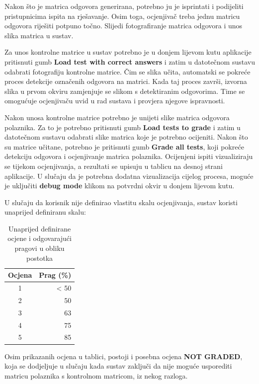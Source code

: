 \documentclass{foi}
\begin{document}
Nakon što je matrica odgovora generirana, potrebno ju je isprintati i podijeliti pristupnicima ispita na rješavanje. Osim toga, ocjenjivač treba jednu matricu odgovora riješiti potpuno točno. Slijedi fotografiranje matrica odgovora i unos slika matrica u sustav.

Za unos kontrolne matrice u sustav potrebno je u donjem lijevom kutu aplikacije pritisnuti gumb \textbf{Load test with correct answers} i zatim u datotečnom sustavu odabrati fotografiju kontrolne matrice. Čim se slika učita, automatski se pokreće proces detekcije označenih odgovora na matrici. Kada taj proces završi, izvorna slika u prvom okviru zamjenjuje se slikom s detektiranim odgovorima. Time se omogućuje ocjenjivaču uvid u rad sustava i provjera njegove ispravnosti.

Nakon unosa kontrolne matrice potrebno je unijeti slike matrica odgovora polaznika. Za to je potrebno pritisnuti gumb \textbf{Load tests to grade} i zatim u datotečnom sustavu odabrati slike matrica koje je potrebno ocijeniti. Nakon što su matrice učitane, potrebno je pritisnuti gumb \textbf{Grade all tests}, koji pokreće detekciju odgovora i ocjenjivanje matrica polaznika. Ocijenjeni ispiti vizualiziraju se tijekom ocjenjivanja, a rezultati se upisuju u tablicu na desnoj strani aplikacije. U slučaju da je potrebna dodatna vizualizacija cijelog procesa, moguće je uključiti \textbf{debug mode} klikom na potvrdni okvir u donjem lijevom kutu.

U slučaju da korisnik nije definirao vlastitu skalu ocjenjivanja, sustav koristi unaprijed definiranu skalu:

\begin{table}[h!]
\centering
\begin{tabular}{|c|r|}
\hline
\textbf{Ocjena} & \textbf{Prag (\%)} \\
\hline
1 & < 50 \\
2 & 50 \\
3 & 63 \\
4 & 75 \\
5 & 85 \\
\hline
\end{tabular}
\caption{Unaprijed definirane ocjene i odgovarajući pragovi u obliku postotka}
\end{table}

Osim prikazanih ocjena u tablici, postoji i posebna ocjena \textbf{NOT GRADED}, koja se dodjeljuje u slučaju kada sustav zaključi da nije moguće usporediti matricu polaznika s kontrolnom matricom, iz nekog razloga.
\end{document}
